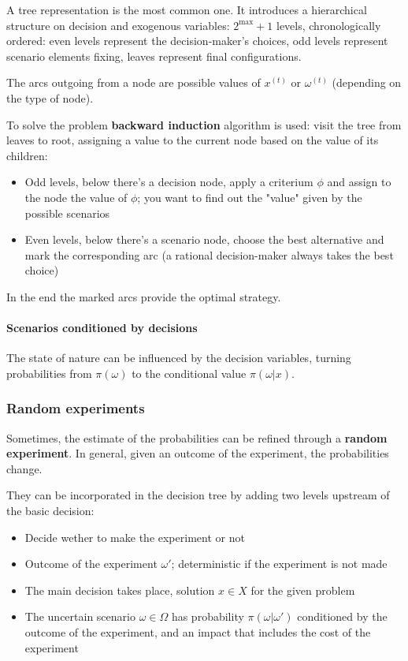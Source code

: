 A tree representation is the most common one. It introduces a hierarchical structure on decision and exogenous variables: $2^{\max} + 1$ levels, chronologically ordered: even levels represent the decision-maker's choices, odd levels represent scenario elements fixing, leaves represent final configurations.

The arcs outgoing from a node are possible values of $x^{(t)}$ or $\omega^{(t)}$ (depending on the type of node).

To solve the problem \textbf{backward induction} algorithm is used: visit the tree from leaves to root, assigning a value to the current node based on the value of its children: 
\begin{itemize}
	\item Odd levels, below there's a decision node, apply a criterium $\phi$ and assign to the node the value of $\phi$; you want to find out the "value" given by the possible scenarios
	
	\item Even levels, below there's a scenario node, choose the best alternative and mark the corresponding arc (a rational decision-maker always takes the best choice)
\end{itemize}

In the end the marked arcs provide the optimal strategy.

\paragraph{Scenarios conditioned by decisions} The state of nature can be influenced by the decision variables, turning probabilities from $\pi (\omega)$ to the conditional value $\pi (\omega | x)$. 

\subsubsection{Random experiments}

Sometimes, the estimate of the probabilities can be refined through a \textbf{random experiment}. In general, given an outcome of the experiment, the probabilities change. 

They can be incorporated in the decision tree by adding two levels upstream of the basic decision: 
\begin{itemize}
	\item Decide wether to make the experiment or not
	
	\item Outcome of the experiment $\omega'$; deterministic if the experiment is not made
	
	\item The main decision takes place, solution $x \in X$ for the given problem 
	
	\item The uncertain scenario $\omega \in \Omega$ has probability $\pi (\omega | \omega')$ conditioned by the outcome of the experiment, and an impact that includes the cost of the experiment
\end{itemize}

